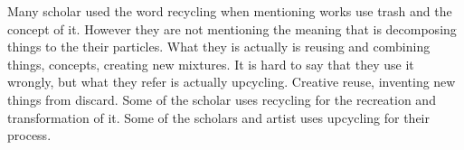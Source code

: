 Many scholar used the word recycling when mentioning works use trash and the concept of it. However they are not mentioning the meaning that is decomposing things to the their particles. What they is actually is reusing and combining things, concepts, creating new mixtures. It is hard to say that they use it wrongly, but what they refer is actually upcycling. Creative reuse, inventing new things from discard. Some of the scholar uses recycling \cite{cerny1996recycled,herman1998trashformations} for the recreation and transformation of it. Some of the scholars and artist uses upcycling for their process.






